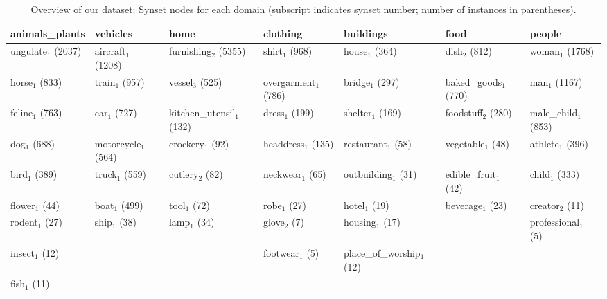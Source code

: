 \documentclass[11pt,a4paper]{article}
\begin{document}
\begin{table}[htb]
\small
	\begin{tabular}{@{~}l@{~}l@{~}l@{~}l@{~}l@{~}l@{~}l}
	\toprule
	        animals\_plants &               vehicles &                        home &                clothing &                   buildings &                    food &                 people \\
	\midrule
	  ungulate$_1$ (2037) &  aircraft$_1$ (1208) &  furnishing$_2$ (5355) &  shirt$_1$ (968) &  house$_1$ (364) &  dish$_2$ (812) &  woman$_1$ (1768) \\
	 horse$_1$ (833) &  train$_1$ (957) &  vessel$_3$ (525) &  overgarment$_1$ (786) &  bridge$_1$ (297) &  baked\_goods$_1$ (770) &  man$_1$ (1167) \\
	  feline$_1$ (763) &  car$_1$ (727) &  kitchen\_utensil$_1$ (132) &  dress$_1$ (199) &  shelter$_1$ (169) &  foodstuff$_2$ (280) &  male\_child$_1$ (853) \\
	 dog$_1$ (688) &  motorcycle$_1$ (564) &  crockery$_1$ (92) &  headdress$_1$ (135) &  restaurant$_1$ (58) &  vegetable$_1$ (48) &  athlete$_1$ (396) \\
	  bird$_1$ (389) &  truck$_1$ (559) &  cutlery$_2$ (82) &  neckwear$_1$ (65) &  outbuilding$_1$ (31) &  edible\_fruit$_1$ (42) &  child$_1$ (333) \\
	  flower$_1$ (44) &  boat$_1$ (499) &  tool$_1$ (72) &  robe$_1$ (27) &  hotel$_1$ (19) &  beverage$_1$ (23) &  creator$_2$ (11) \\
	  rodent$_1$ (27) &  ship$_1$ (38) &  lamp$_1$ (34) &  glove$_2$ (7) &  housing$_1$ (17) &   &  professional$_1$ (5) \\
	 insect$_1$ (12) &   &   &  footwear$_1$ (5) &  place\_of\_worship$_1$ (12) &   &   \\
	  fish$_1$ (11) &   &   &   &   &   &   \\
	\bottomrule
\end{tabular}
	\caption{Overview of our dataset: Synset nodes for each domain (subscript indicates synset number; number of instances in parentheses). %
		 \label{tab:overview_dataset2}}
      \end{table}
      
\end{document}
